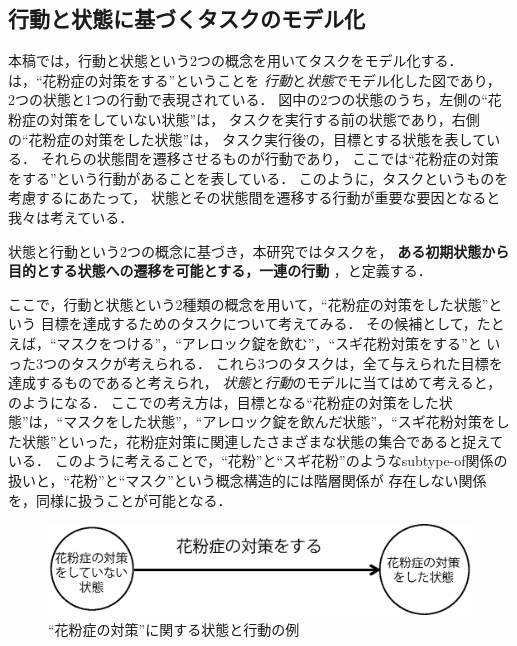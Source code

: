 \documentclass[submit,techreq]{ipsj}
\begin{document}
\subsection{行動と状態に基づくタスクのモデル化}
本稿では，行動と状態という2つの概念を用いてタスクをモデル化する．
は，``花粉症の対策をする''ということを
\textit{行動}と\textit{状態}でモデル化した図であり，
2つの状態と1つの行動で表現されている．
図中の2つの状態のうち，左側の``花粉症の対策をしていない状態''は，
タスクを実行する前の状態であり，右側の``花粉症の対策をした状態''は，
タスク実行後の，目標とする状態を表している．
それらの状態間を遷移させるものが行動であり，
ここでは``花粉症の対策をする''という行動があることを表している．
このように，タスクというものを考慮するにあたって，
状態とその状態間を遷移する行動が重要な要因となると我々は考えている．

状態と行動という2つの概念に基づき，本研究ではタスクを，
\textbf{ある初期状態から目的とする状態への遷移を可能とする，一連の行動}
，と定義する．




ここで，行動と状態という2種類の概念を用いて，``花粉症の対策をした状態''という
目標を達成するためのタスクについて考えてみる．
その候補として，たとえば，``マスクをつける''，``アレロック錠を飲む''，``スギ花粉対策をする''と
いった3つのタスクが考えられる．
これら3つのタスクは，全て与えられた目標を達成するものであると考えられ，
\textit{状態}と\textit{行動}のモデルに当てはめて考えると，のようになる．
ここでの考え方は，目標となる``花粉症の対策をした状態''は，``マスクをした状態''，``アレロック錠を飲んだ状態''，``スギ花粉対策をした状態''といった，花粉症対策に関連したさまざまな状態の集合であると捉えている．
このように考えることで，``花粉''と``スギ花粉''のようなsubtype-of関係の
扱いと，``花粉''と``マスク''という概念構造的には階層関係が
存在しない関係を，同様に扱うことが可能となる．


\begin{figure}[t]
\centering
\includegraphics[width=0.8\hsize]{state_action.eps}
\vspace{-0.5em}
\caption{``花粉症の対策''に関する状態と行動の例}
\label{fig:state_action}
\vspace{-0.5em}
\end{figure}
\end{document}
